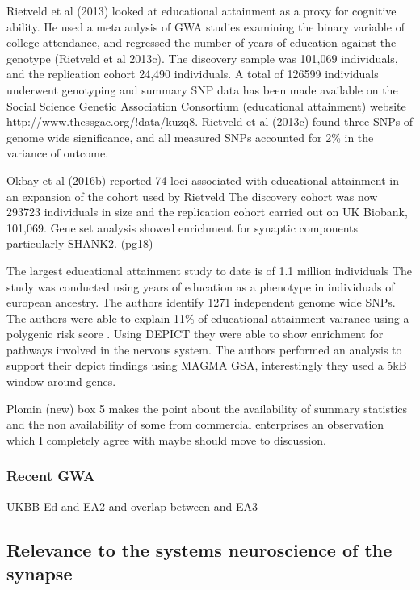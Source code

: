 Rietveld et al (2013) \cite{rietveld2013gwas} looked at educational attainment as a proxy for cognitive ability. He used a meta anlysis of GWA studies examining the binary variable of college attendance, and regressed the number of years of education against the genotype (Rietveld et al 2013c). The discovery sample was 101,069 individuals, and the replication cohort 24,490 individuals. A total of 126599 individuals underwent genotyping and summary SNP data has been made available on the Social Science Genetic Association Consortium (educational attainment) website http://www.thessgac.org/!data/kuzq8. Rietveld et al (2013c) found three SNPs of genome wide significance, and all measured SNPs accounted for 2\% in the variance of outcome.\cite{rietveld2013gwas}

Okbay et al \cite{okbay2016genome}(2016b) reported 74 loci associated with educational attainment in an expansion of the cohort used by Rietveld The discovery cohort was now 293723 individuals in size and the replication cohort carried out on UK Biobank, 101,069. Gene set analysis showed enrichment for synaptic components particularly SHANK2. (pg18)

The largest educational attainment study to date is of 1.1 million individuals \cite{lee2018gene} The study was conducted using years of education as a phenotype in individuals of european ancestry. The authors identify 1271 independent genome wide SNPs. The authors were able to explain 11\% of educational attainment vairance using a polygenic risk score \cite{lee2018gene} . Using DEPICT they were able to show enrichment for pathways involved in the nervous system. The authors performed an analysis to support their depict findings using MAGMA GSA, interestingly they used a 5kB window around genes.  

Plomin (new) \cite{plomin2018new} box 5 makes the point about the availability of summary statistics and the non availability of some from commercial enterprises an observation which I completely agree with maybe should move to discussion.

\subsubsection{Recent GWA}
UKBB Ed and EA2 and overlap between and EA3

\subsection{Relevance to the systems neuroscience of the synapse}

